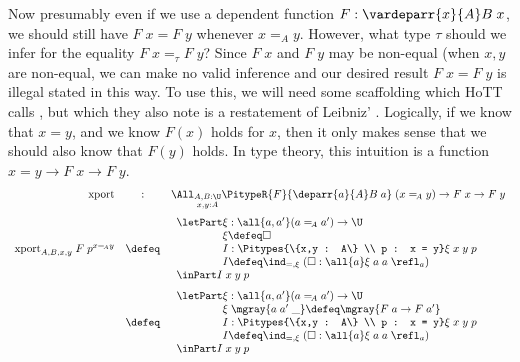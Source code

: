 \documentclass[11pt]{article} %
\theoremstyle{definition}
\theoremstyle{remark}
\begin{document}
Now presumably even if we use a dependent function $F : \vardeparr{x}{A} B\;x$, we should still have $F\;x = F\;y$ whenever $x =_{\!A} y$.
However, what type $\tau$ should we infer for the equality $F\;x =_\tau F\;y$?
Since $F\;x$ and $F\;y$ may be non-equal (when $x, y$ are non-equal, we can make no valid inference and our desired result $F\;x = F\;y$ is illegal stated in this way.
To use this, we will need some scaffolding which HoTT calls , but which they also note is a restatement of Leibniz' .
Logically, if we know that $x = y$, and we know $F(x)$ holds for $x$, then it only makes sense that we should also know that $F(y)$ holds.
In type theory, this intuition is a function $x = y \to F\;x \to F\;y$.
\[\begin{array}{rcl}
  \mathrm{xport} &:& \displaystyle
    \All_{\substack{A,B : \U \\ x,y : A}}
    \PitypeR{F}{\deparr{a}{A} B\;a}\;
    (x =_{\!A} y) \to
    F\;x \to F\;y \\ \\[-0.5em]
  \mathrm{xport}_{A,B,x,y}\;F\;p^{x =_{\!A} y} &\defeq&
      \begin{array}{l}
        \letPart \xi : \all{a,a'} (a =_{\!A} a') \to \U \\
        \phantom{\letPart\mathstrut} \xi \defeq \square \\
        \phantom{\letPart\mathstrut} I : \Pitypes{\{x,y : A\} \\ p : x = y} \xi\;x\;y\;p \\
        \phantom{\letPart\mathstrut} I \defeq \ind_{=,\xi}\;(\square : \all{a}\xi\;a\;a\;\refl_a) \\
        \inPart I \;x\;y\;p\\
      \end{array} \\ \\[-0.5em]
  &\defeq&
      \begin{array}{l}
        \letPart \xi : \all{a,a'} (a =_{\!A} a') \to \U \\
        \phantom{\letPart\mathstrut} \xi\;\mgray{a\;a'\;\_} \defeq \mgray{F\;a \to F\;a'} \\
        \phantom{\letPart\mathstrut} I : \Pitypes{\{x,y : A\} \\ p : x = y} \xi\;x\;y\;p \\
        \phantom{\letPart\mathstrut} I \defeq \ind_{=,\xi}\;(\square : \all{a}\xi\;a\;a\;\refl_a) \\
        \inPart I \;x\;y\;p\\

\end{array}
\end{array}\]
\end{document}
